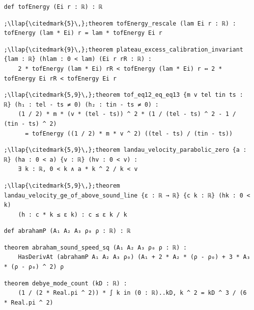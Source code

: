 \begin{lstlisting}[style=leancat]
def tofEnergy (Ei r : ℝ) : ℝ
\end{lstlisting}

\begin{lstlisting}[style=leancat]
;\llap{\citedmark{5}\,};theorem tofEnergy_rescale (lam Ei r : ℝ) : tofEnergy (lam * Ei) r = lam * tofEnergy Ei r
\end{lstlisting}

\begin{lstlisting}[style=leancat]
;\llap{\citedmark{9}\,};theorem plateau_excess_calibration_invariant {lam : ℝ} (hlam : 0 < lam) (Ei r rR : ℝ) :
    2 * tofEnergy (lam * Ei) rR < tofEnergy (lam * Ei) r ↔ 2 * tofEnergy Ei rR < tofEnergy Ei r
\end{lstlisting}

\begin{lstlisting}[style=leancat]
;\llap{\citedmark{5,9}\,};theorem tof_eq12_eq_eq13 {m v tel tin ts : ℝ} (h₁ : tel - ts ≠ 0) (h₂ : tin - ts ≠ 0) :
    (1 / 2) * m * (v * (tel - ts)) ^ 2 * (1 / (tel - ts) ^ 2 - 1 / (tin - ts) ^ 2)
      = tofEnergy ((1 / 2) * m * v ^ 2) ((tel - ts) / (tin - ts))
\end{lstlisting}

\begin{lstlisting}[style=leancat]
;\llap{\citedmark{5,9}\,};theorem landau_velocity_parabolic_zero {a : ℝ} (ha : 0 < a) {v : ℝ} (hv : 0 < v) :
    ∃ k : ℝ, 0 < k ∧ a * k ^ 2 / k < v
\end{lstlisting}

\begin{lstlisting}[style=leancat]
;\llap{\citedmark{5,9}\,};theorem landau_velocity_ge_of_above_sound_line {ε : ℝ → ℝ} {c k : ℝ} (hk : 0 < k)
    (h : c * k ≤ ε k) : c ≤ ε k / k
\end{lstlisting}

\begin{lstlisting}[style=leancat]
def abrahamP (A₁ A₂ A₃ ρ₀ ρ : ℝ) : ℝ
\end{lstlisting}

\begin{lstlisting}[style=leancat]
theorem abraham_sound_speed_sq (A₁ A₂ A₃ ρ₀ ρ : ℝ) :
    HasDerivAt (abrahamP A₁ A₂ A₃ ρ₀) (A₁ + 2 * A₂ * (ρ - ρ₀) + 3 * A₃ * (ρ - ρ₀) ^ 2) ρ
\end{lstlisting}

\begin{lstlisting}[style=leancat]
theorem debye_mode_count (kD : ℝ) :
    (1 / (2 * Real.pi ^ 2)) * ∫ k in (0 : ℝ)..kD, k ^ 2 = kD ^ 3 / (6 * Real.pi ^ 2)
\end{lstlisting}

